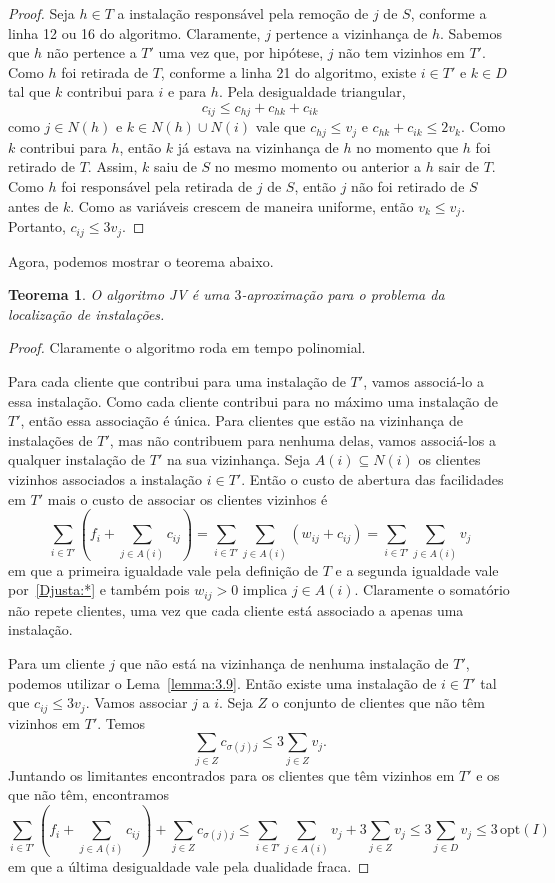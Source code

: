 \documentclass[12pt]{article}
\newcommand{\opt}{\ensuremath{\mathrm{opt}}}
\newtheorem{theorem}{Teorema}[section]
\begin{document}
\begin{proof}
    Seja $h \in T$ a instalação responsável pela remoção de $j$ de $S$, conforme a linha 12 ou 16 do algoritmo. Claramente, $j$ pertence a vizinhança de $h$. Sabemos que $h$ não pertence a $T'$ uma vez que, por hipótese, $j$ não tem vizinhos em $T'$. Como $h$ foi retirada de $T$, conforme a linha 21 do algoritmo, existe $i \in T'$ e $k \in D$ tal que $k$ contribui para $i$ e para $h$. Pela desigualdade triangular,
    \[c_{ij} \leq c_{hj} + c_{hk} + c_{ik}\]
    como $j \in N(h)$ e $k \in N(h) \cup N(i)$ vale que $c_{hj} \leq v_j$ e $c_{hk} + c_{ik} \leq 2v_k$. Como $k$ contribui para $h$, então $k$ já estava na vizinhança de $h$ no momento que $h$ foi retirado de $T$. Assim, $k$ saiu de $S$ no mesmo momento ou anterior a $h$ sair de $T$. Como $h$ foi responsável pela retirada de $j$ de $S$, então $j$ não foi retirado de $S$ antes de $k$. Como as variáveis crescem de maneira uniforme, então $v_k \leq v_j$. 
    Portanto, $c_{ij}\leq 3v_j$. 
\end{proof}

Agora, podemos mostrar o teorema abaixo.
\begin{theorem}
    O algoritmo {\sc JV} é uma $3$-aproximação para o problema da localização de instalações.
\end{theorem}
\begin{proof}
    Claramente o algoritmo roda em tempo polinomial. 

    Para cada cliente que contribui para uma instalação de $T'$, vamos associá-lo a essa instalação. Como cada cliente contribui para no máximo uma instalação de $T'$, então essa associação é única. Para clientes que estão na vizinhança de instalações de $T'$, mas não contribuem para nenhuma delas, vamos associá-los a qualquer instalação de $T'$ na sua vizinhança.
    Seja $A(i) \subseteq N(i)$ os clientes vizinhos associados a instalação $i \in T'$. Então o custo de abertura das facilidades em $T'$ mais o custo de associar os clientes vizinhos é
    \[\sum_{i \in T'} (f_i + \sum_{j \in A(i)} c_{ij}) = \sum_{i \in T'} \sum_{j \in A(i)} (w_{ij} + c_{ij}) = \sum_{i \in T'} \sum_{j \in A(i)} v_j\]
    em que a primeira igualdade vale pela definição de $T$ e a segunda igualdade vale por~\eqref{Djusta:*} e também pois $w_{ij} > 0$ implica $j \in A(i)$. Claramente o somatório não repete clientes, uma vez que cada cliente está associado a apenas uma instalação.

    Para um cliente $j$ que não está na vizinhança de nenhuma instalação de $T'$, podemos utilizar o Lema~\ref{lemma:3.9}. Então existe uma instalação de $i \in T'$ tal que $c_{ij} \leq 3v_j$. Vamos associar $j$ a $i$. Seja $Z$ o conjunto de clientes que não têm vizinhos em $T'$. Temos
    \[\sum_{j \in Z}c_{\sigma(j)j} \leq 3\sum_{j \in Z}v_j.\]
    Juntando os limitantes encontrados para os clientes que têm vizinhos em $T'$ e os que não têm, encontramos
    \[\sum_{i \in T'} (f_i + \sum_{j \in A(i)} c_{ij}) + \sum_{j \in Z} c_{\sigma(j)j}\leq \sum_{i \in T'} \sum_{j \in A(i)} v_j + 3 \sum_{j \in Z} v_j \leq 3 \sum_{j \in D} v_j\leq 3\,\opt(I)\]
    em que a última desigualdade vale pela dualidade fraca.
\end{proof}
\newpage
\end{document}
